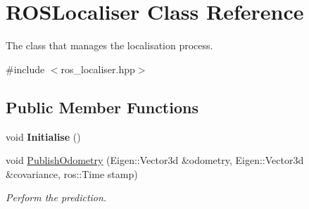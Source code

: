 \hypertarget{classROSLocaliser}{}\section{R\+O\+S\+Localiser Class Reference}
\label{classROSLocaliser}


The class that manages the localisation process.  




{\ttfamily \#include $<$ros\+\_\+localiser.\+hpp$>$}

\subsection*{Public Member Functions}
\begin{DoxyCompactItemize}
\item 
\mbox{\label{classROSLocaliser_a87eb20c0496eb78fbf79b02047b0583d}} 
void {\bfseries Initialise} ()
\item 
\mbox{\label{classROSLocaliser_a3b64a321509d2c85146ea469d544f8c8}} 
void \hyperlink{classROSLocaliser_a3b64a321509d2c85146ea469d544f8c8}{Publish\+Odometry} (Eigen\+::\+Vector3d \&odometry, Eigen\+::\+Vector3d \&covariance, ros\+::\+Time stamp)
\begin{DoxyCompactList}\small\item\em Perform the prediction. \end{DoxyCompactList}\end{DoxyCompactItemize}
